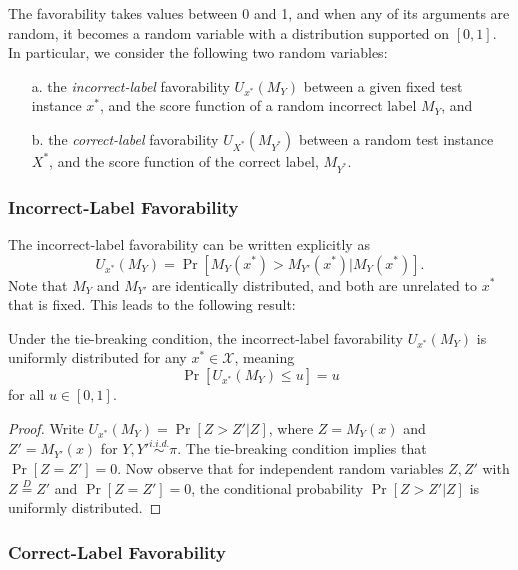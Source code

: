 \documentclass[twoside,11pt]{article}
\begin{document}
The favorability takes values between 0 and 1, and when any of its
arguments are random, it becomes a random variable with a distribution
supported on $[0,1]$.  In particular, we consider the following two
random variables:
\begin{itemize}
\item[a.] the \emph{incorrect-label} favorability $U_{x^*}(M_Y)$
  between a given fixed test instance $x^*$, and the score function of
  a random incorrect label $M_{Y}$, and
\item[b.] the \emph{correct-label} favorability $U_{X^*}(M_{Y^*})$
  between a random test instance $X^*$, and the score function of the
  correct label, $M_{Y^*}$.
\end{itemize}
\subsubsection{Incorrect-Label Favorability}
The incorrect-label favorability can be written explicitly as
\begin{equation} %
U_{x^*}(M_Y) = \Pr[M_{Y}(x^*) > M_{Y'}(x^*)|M_{Y}(x^*)].
\end{equation}
Note that $M_Y$ and $M_{Y'}$ are identically distributed, and both
are unrelated to $x^*$ that is fixed. This leads to the following
result:
\begin{lemma}\label{lemma:U_function}
Under the tie-breaking condition, the incorrect-label favorability
$U_{x^*}(M_Y)$ is uniformly distributed for any $x^* \in \mathcal{X}$,
meaning \begin{equation}\label{eq:Uniform} \Pr[U_{x^*}(M_Y) \leq u] = u
\end{equation}
for all $u \in [0,1].$
\end{lemma}


\begin{proof} Write $U_{x^*}(M_Y) = \Pr[Z > Z'|Z]$, where $Z = M_Y(x)$ and $Z' =
M_{Y'}(x)$ for $Y, Y' \stackrel{i.i.d.}{\sim} \pi$.
The tie-breaking condition implies that $\Pr[Z=Z']=0$.  Now observe that for independent random variables $Z, Z'$ with $Z \stackrel{D}{=} Z'$ and $\Pr[Z=Z']=0$, the conditional probability
$\Pr[Z > Z'|Z]$ is uniformly distributed.
\end{proof}


\subsubsection{Correct-Label Favorability}
\end{document}
